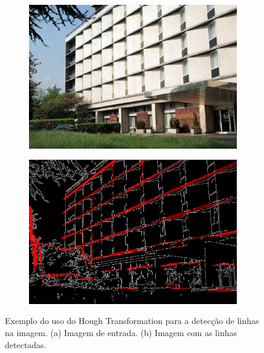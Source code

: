 \begin{figure}[H]
    \centering
    \begin{subfigure}[t]{0.4\textwidth}
      \includegraphics[width=\textwidth]{figuras/houghBefore.jpg}
    \end{subfigure}
    \begin{subfigure}[t]{0.4\textwidth}
      \includegraphics[width=\textwidth]{figuras/houghAfter.png}
    \end{subfigure}
    \caption{Exemplo do uso do Hough Transformation para a detecção de linhas
            na imagem. (a) Imagem de entrada. (b) Imagem com as linhas detectadas.}
    \label{fig:hough}
\end{figure}

